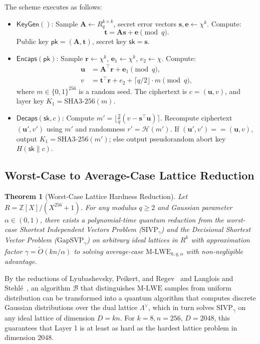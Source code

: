 \documentclass{ieeeaccess}
\newcommand{\Z}{\mathbb{Z}}
\newcommand{\calB}{\mathcal{B}}
\newcommand{\bfs}{\mathbf{s}}
\newcommand{\bfe}{\mathbf{e}}
\newcommand{\bft}{\mathbf{t}}
\newcommand{\bfu}{\mathbf{u}}
\newcommand{\bfr}{\mathbf{r}}
\newcommand{\bfA}{\mathbf{A}}
\newtheorem{theorem}{Theorem}
\newenvironment{proof}{\begin{IEEEproof}\IEEEQEDoff}{\end{IEEEproof}}
\begin{document}
The scheme executes as follows:
\begin{itemize}
  \item $\mathsf{KeyGen}()$: Sample $\bfA \leftarrow R_q^{k \times k}$, secret error vectors $\bfs, \bfe \leftarrow \chi^k$. Compute:
  \begin{equation}
    \bft = \bfA \bfs + \bfe \pmod q.
    \label{eq:L1-pk}
  \end{equation}
  Public key $\mathsf{pk} = (\bfA, \bft)$, secret key $\mathsf{sk} = \bfs$.
  \item $\mathsf{Encaps}(\mathsf{pk})$: Sample $\bfr \leftarrow \chi^k$, $\bfe_1 \leftarrow \chi^k$, $e_2 \leftarrow \chi$. Compute:
  \begin{equation}
  \begin{aligned}
    \bfu &= \bfA^\top \bfr + \bfe_1 \pmod q, \\
    v &= \bft^\top \bfr + e_2 + \lceil q/2 \rfloor \cdot m \pmod q,
  \end{aligned}
  \end{equation}
  where $m \in \{0,1\}^{256}$ is a random seed. The ciphertext is $c = (\bfu, v)$, and layer key $K_1 = \mathrm{SHA3\text{-}256}(m)$.
  \item $\mathsf{Decaps}(\mathsf{sk}, c)$: Compute $m' = \lfloor \frac{2}{q}(v - \bfs^\top \bfu) \rceil$. Recompute ciphertext $(\bfu', v')$ using $m'$ and randomness $r' = \mathcal{H}(m')$. If $(\bfu', v') == (\bfu, v)$, output $K_1 = \mathrm{SHA3\text{-}256}(m')$; else output pseudorandom abort key $H(\mathsf{sk} \parallel c)$.
\end{itemize}

\subsection{Worst-Case to Average-Case Lattice Reduction}
\begin{theorem}[Worst-Case Lattice Hardness Reduction]
\label{thm:L1-regev}
Let $R = \Z[X]/(X^{256}+1)$. For any modulus $q \geq 2$ and Gaussian parameter $\alpha \in (0, 1)$, there exists a polynomial-time quantum reduction from the worst-case Shortest Independent Vectors Problem ($\mathrm{SIVP}_\gamma$) and the Decisional Shortest Vector Problem ($\mathrm{GapSVP}_\gamma$) on arbitrary ideal lattices in $R^k$ with approximation factor $\gamma = \widetilde{O}(k n / \alpha)$ to solving average-case $\mathrm{M\text{-}LWE}_{k, q, \alpha}$ with non-negligible advantage.
\end{theorem}
\begin{proof}
By the reductions of Lyubashevsky, Peikert, and Regev~\cite{LPR2010} and Langlois and Stehl{\'e}~\cite{Langlois2015}, an algorithm $\calB$ that distinguishes $\mathrm{M\text{-}LWE}$ samples from uniform distribution can be transformed into a quantum algorithm that computes discrete Gaussian distributions over the dual lattice $\Lambda^\vee$, which in turn solves $\mathrm{SIVP}_\gamma$ on any ideal lattice of dimension $D = kn$. For $k=8, n=256$, $D=2048$, this guarantees that Layer 1 is at least as hard as the hardest lattice problem in dimension 2048.
\end{proof}
\end{document}
